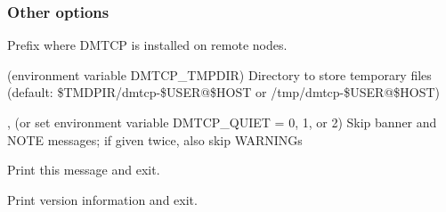 \subsubsection{Other options}
\begin{Description}
  \item[\OptSArg{--prefix}{path}]
    Prefix where DMTCP is installed on remote nodes.
  \item[\OptSArg{--tmpdir}{path} (environment variable DMTCP_TMPDIR)]
    Directory to store temporary files
    (default: \$TMDPIR/dmtcp-\$USER@\$HOST or /tmp/dmtcp-\$USER@\$HOST)
  \item[\Opt{-q}, \Opt{--quiet} (or set environment variable DMTCP_QUIET = 0, 1, or 2)]
    Skip banner and NOTE messages; if given twice, also skip WARNINGs
  \item[\Opt{--help}] Print this message and exit.
  \item[\Opt{--version}] Print version information and exit.
\end{Description}
